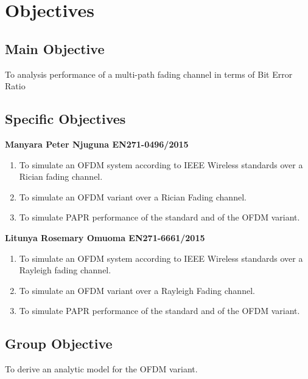 
\section{Objectives}

\subsection{Main Objective}
To analysis performance of a multi-path fading channel in terms of Bit Error Ratio 

\subsection{Specific Objectives}


\textbf{Manyara Peter Njuguna EN271-0496/2015}
\begin{enumerate}[label=\roman*.]
	\item To simulate an \gls{OFDM} system according to IEEE Wireless standards over a Rician fading channel. 
	\item To simulate an \gls{OFDM} variant over a Rician Fading channel.
	\item To simulate \gls{PAPR} performance of the standard and of the \gls{OFDM} variant.
\end{enumerate}
\textbf{Litunya Rosemary Omuoma EN271-6661/2015}
\begin{enumerate}[label=\roman*.]
	\item To simulate an \gls{OFDM} system according to IEEE Wireless standards over a Rayleigh fading channel.

	\item To simulate an \gls{OFDM} variant over a Rayleigh Fading channel.
	\item To simulate \gls{PAPR} performance of the standard and of the \gls{OFDM} variant.
\end{enumerate}


\subsection{Group Objective}
To derive an analytic model for the \gls{OFDM} variant.

